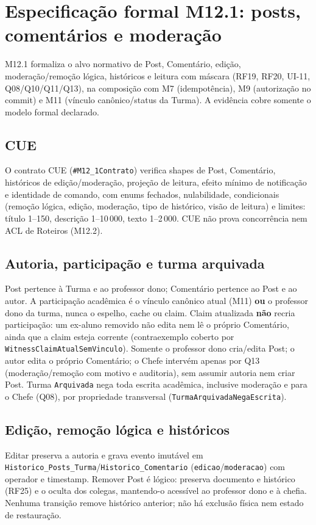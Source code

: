 \clearpage
\section{Especificação formal M12.1: posts, comentários e moderação}
\label{sec:formal-m12-1}
\sloppy

M12.1 formaliza o alvo normativo de Post, Comentário, edição, moderação/remoção
lógica, históricos e leitura com máscara (RF19, RF20, UI-11, Q08/Q10/Q11/Q13),
na composição com M7 (idempotência), M9 (autorização no commit) e M11 (vínculo
canônico/status da Turma). A evidência cobre somente o modelo formal declarado.

\subsection*{CUE}
O contrato CUE (\texttt{\#M12\_1Contrato}) verifica shapes de Post, Comentário,
históricos de edição/moderação, projeção de leitura, efeito mínimo de
notificação e identidade de comando, com enums fechados, nulabilidade,
condicionais (remoção lógica, edição, moderação, tipo de histórico, visão de
leitura) e limites: título 1--150, descrição 1--10\,000, texto 1--2\,000. CUE
não prova concorrência nem ACL de Roteiros (M12.2).

\subsection*{Autoria, participação e turma arquivada}
Post pertence à Turma e ao professor dono; Comentário pertence ao Post e ao
autor. A participação acadêmica é o vínculo canônico atual (M11) \textbf{ou} o
professor dono da turma, nunca o espelho, cache ou claim. Claim atualizada
\textbf{não} recria participação: um ex-aluno removido não edita nem lê o
próprio Comentário, ainda que a claim esteja corrente (contraexemplo coberto por
\texttt{WitnessClaimAtualSemVinculo}). Somente o professor dono cria/edita Post;
o autor edita o próprio Comentário; o Chefe intervém apenas por Q13
(moderação/remoção com motivo e auditoria), sem assumir autoria nem criar Post.
Turma \texttt{Arquivada} nega toda escrita acadêmica, inclusive moderação e
para o Chefe (Q08), por propriedade transversal
(\texttt{TurmaArquivadaNegaEscrita}).

\subsection*{Edição, remoção lógica e históricos}
Editar preserva a autoria e grava evento imutável em
\texttt{Historico\_Posts\_Turma}/\texttt{Historico\_Comentario}
(\texttt{edicao}/\texttt{moderacao}) com operador e timestamp. Remover Post é
lógico: preserva documento e histórico (RF25) e o oculta dos colegas, mantendo-o
acessível ao professor dono e à chefia. Nenhuma transição remove histórico
anterior; não há exclusão física nem estado de restauração.

